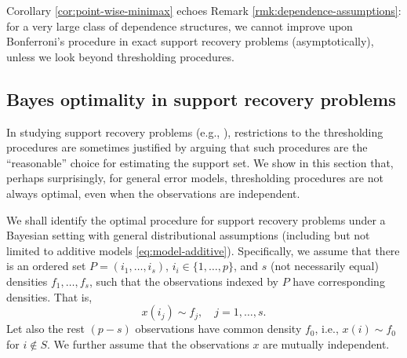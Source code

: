 \begin{remark}
Corollary \ref{cor:point-wise-minimax} echoes Remark \ref{rmk:dependence-assumptions}: for a very large class of dependence structures, we cannot improve upon Bonferroni's procedure in exact support recovery problems (asymptotically), unless we look beyond thresholding procedures.
\end{remark}


\subsection{Bayes optimality in support recovery problems}
\label{subsec:Bayes-optimality}

In studying support recovery problems (e.g., \citet{arias2017distribution}), restrictions to the thresholding procedures are sometimes justified by arguing that such procedures are the ``reasonable'' choice for estimating the support set.
We show in this section that, perhaps surprisingly, for general error models, thresholding procedures are not always optimal, even when the observations are independent.

We shall identify the optimal procedure for support recovery problems under a Bayesian setting with general distributional assumptions (including but not limited to additive models \eqref{eq:model-additive}).
Specifically, we assume that there is an ordered set $P = (i_1,\ldots,i_s)$, $i_i\in\{1,\ldots,p\}$, and $s$ (not necessarily equal) densities $f_{1}, \ldots, f_{s}$, such that the observations indexed by $P$ have corresponding densities. That is,
\begin{equation} \label{eq:signal-distributions-ordered}
x(i_j) \sim f_j, \quad j=1,\ldots,s.
\end{equation}
Let also the rest $(p-s)$ observations have common density $f_0$, i.e., $x(i)\sim f_0$ for $i\not\in S$.
We further assume that the observations $x$ are mutually independent.

